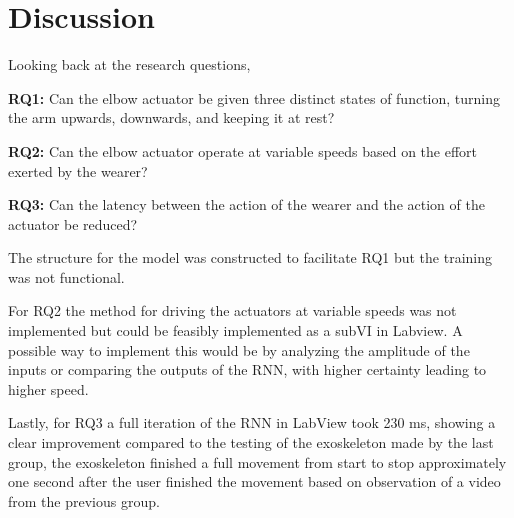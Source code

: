 \section{Discussion}
\label{section:disc}

Looking back at the research questions,

\textbf{RQ1:} Can the elbow actuator be given three distinct states of function, turning the arm upwards, downwards, and keeping it at rest?

\textbf{RQ2:} Can the elbow actuator operate at variable speeds based on the effort exerted by the wearer?

\textbf{RQ3:} Can the latency between the action of the wearer and the action of the actuator be reduced?

The structure for the model was constructed to facilitate RQ1 but the training was not functional.

For RQ2 the method for driving the actuators at variable speeds was not implemented but could be feasibly implemented as a subVI in Labview. 
A possible way to implement this would be by analyzing the amplitude of the inputs or comparing the outputs of the RNN, with higher certainty leading to higher speed.

Lastly, for RQ3 a full iteration of the RNN in LabView took 230 ms, showing a clear improvement compared to the testing of the exoskeleton 
made by the last group, the exoskeleton finished a full movement from start to stop approximately one second after the user finished the 
movement based on observation of a video from the previous group.
